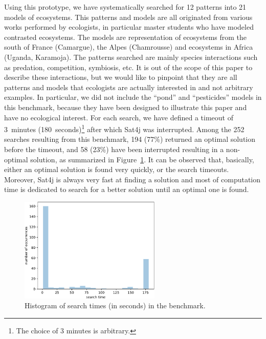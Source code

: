 \documentclass[a4paper,twoside]{article}
\begin{document}
Using this prototype, we have systematically searched for 12 patterns into 21 models of ecosystems.
This patterns and models are all originated from various works performed by ecologists, in particular master students who have modeled contrasted ecosystems. The models are representation of ecosystems from the south of France (Camargue), the Alpes (Chamrousse) and ecosystems in Africa (Uganda, Karamoja). The patterns searched are mainly species interactions such as predation, competition, symbiosis, etc.
It is out of the scope of this paper to describe these interactions, but we would like to pinpoint that they are all patterns and models that ecologists are actually interested in and not arbitrary examples. 
In particular, we did not include the ``pond'' and ``pesticides'' models in this benchmark, because they have been designed to illustrate this paper and have no ecological interest.
For each search, we have defined a timeout of 3~minutes (180~seconds)\footnote{The choice of 3 minutes is arbitrary.} after which Sat4j was interrupted.
Among the 252 searches resulting from this benchmark, 194 (77\%) returned an optimal solution before the timeout, and 58 (23\%) have been interrupted resulting in a non-optimal solution, as summarized in Figure~\ref{fig:histo}.
It can be observed that, basically, either an optimal solution is found very quickly, or the search timeouts.
Moreover, Sat4j is always very fast at finding a solution and most of computation time is dedicated to search for a better solution until an optimal one is found.

\begin{figure}[t]
  \begin{center}
    \includegraphics[width=0.6\textwidth]{histogram}
  \end{center}
 
  \caption{Histogram of search times (in seconds) in the benchmark.}
  \label{fig:histo}
\end{figure} 
\end{document}
